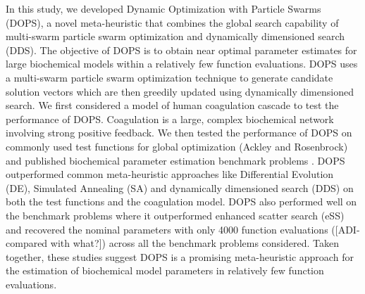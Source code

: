 \documentclass[12pt]{article}
\begin{document}

In this study, we developed Dynamic Optimization with Particle Swarms (DOPS), a novel meta-heuristic that combines the global search capability of multi-swarm particle swarm optimization and dynamically dimensioned search (DDS). The objective of DOPS is to obtain near optimal parameter estimates for large biochemical models within a relatively few function evaluations.
DOPS uses a multi-swarm particle swarm optimization technique to generate candidate solution vectors which are then greedily updated using dynamically dimensioned search. We first considered a model of human coagulation cascade to test the performance of DOPS. Coagulation is a large, complex biochemical network involving strong positive feedback.
We then tested the performance of DOPS on commonly used test functions for global optimization (Ackley and Rosenbrock) and published biochemical parameter estimation benchmark problems \cite{villaverde2015biopredyn}. DOPS outperformed common meta-heuristic approaches like Differential Evolution (DE), Simulated Annealing (SA) and dynamically dimensioned search (DDS) on both the test functions and the coagulation model.
DOPS also performed well on the benchmark problems where it outperformed enhanced scatter search (eSS) and recovered the nominal parameters with only 4000 function evaluations ([ADI-compared with what?])
across all the benchmark problems considered.
Taken together, these studies suggest DOPS is a promising meta-heuristic approach for the estimation of biochemical model parameters in relatively few function evaluations.

\end{document}
